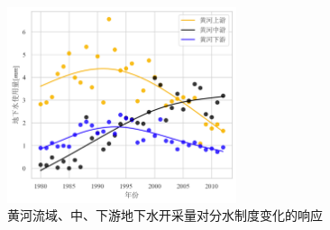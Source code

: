\begin{figure}[htb]
    \centering
    \includegraphics[width=0.6\textwidth]{img/ch6/ch6_groundwater.png}
    \caption{黄河流域、中、下游地下水开采量对分水制度变化的响应}\label{ch6:fig:groundwater}
\end{figure}